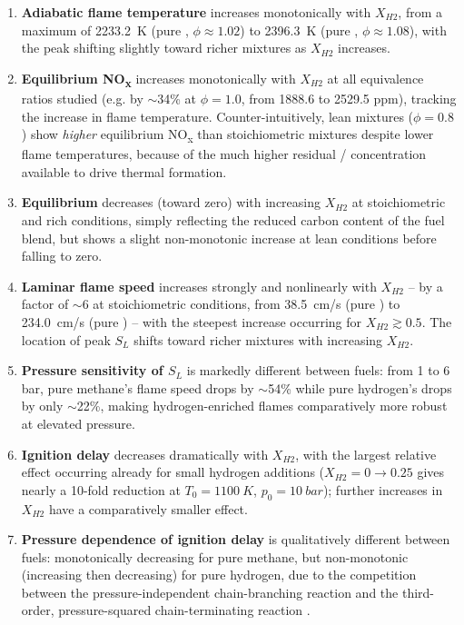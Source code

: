 \documentclass[11pt,a4paper]{article}
\begin{document}
\begin{enumerate}
    \item \textbf{Adiabatic flame temperature} increases monotonically with $X_{H2}$, from a maximum of
    \SI{2233.2}{K} (pure , $\phi\approx1.02$) to \SI{2396.3}{K} (pure , $\phi\approx1.08$), with the
    peak shifting slightly toward richer mixtures as $X_{H2}$ increases.
    \item \textbf{Equilibrium NO\textsubscript{x}} increases monotonically with $X_{H2}$ at all equivalence ratios studied
    (e.g. by $\sim$34\% at $\phi=1.0$, from 1888.6 to 2529.5 ppm), tracking the increase in flame temperature.
    Counter-intuitively, lean mixtures ($\phi=0.8$) show \emph{higher} equilibrium NO\textsubscript{x} than stoichiometric
    mixtures despite lower flame temperatures, because of the much higher residual / concentration
    available to drive thermal  formation.
    \item \textbf{Equilibrium } decreases (toward zero) with increasing $X_{H2}$ at stoichiometric and rich
    conditions, simply reflecting the reduced carbon content of the fuel blend, but shows a slight non-monotonic
    increase at lean conditions before falling to zero.
    \item \textbf{Laminar flame speed} increases strongly and nonlinearly with $X_{H2}$ -- by a factor of
    $\sim$6 at stoichiometric conditions, from \SI{38.5}{cm/s} (pure ) to \SI{234.0}{cm/s} (pure ) --
    with the steepest increase occurring for $X_{H2}\gtrsim0.5$. The location of peak $S_L$ shifts toward richer
    mixtures with increasing $X_{H2}$.
    \item \textbf{Pressure sensitivity of $S_L$} is markedly different between fuels: from 1 to 6 bar, pure
    methane's flame speed drops by $\sim$54\% while pure hydrogen's drops by only $\sim$22\%, making
    hydrogen-enriched flames comparatively more robust at elevated pressure.
    \item \textbf{Ignition delay} decreases dramatically with $X_{H2}$, with the largest relative effect occurring
    already for small hydrogen additions ($X_{H2}=0\to0.25$ gives nearly a 10-fold reduction at $T_0=\SI{1100}{K}$,
    $p_0=\SI{10}{bar}$); further increases in $X_{H2}$ have a comparatively smaller effect.
    \item \textbf{Pressure dependence of ignition delay} is qualitatively different between fuels: monotonically
    decreasing for pure methane, but non-monotonic (increasing then decreasing) for pure hydrogen, due to the
    competition between the pressure-independent chain-branching reaction  and the third-order,
    pressure-squared chain-terminating reaction .
\end{enumerate}
\end{document}

